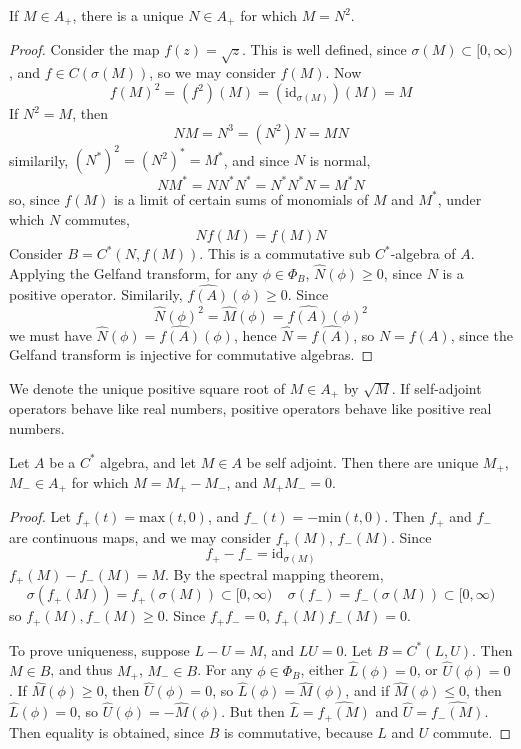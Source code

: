 \begin{prop}
    If $M \in A_+$, there is a unique $N \in A_+$ for which $M = N^2$.
\end{prop}
\begin{proof}
    Consider the map $f(z) = \sqrt{z}$. This is well defined, since $\sigma(M) \subset [0,\infty)$, and $f \in C(\sigma(M))$, so we may consider $f(M)$. Now
    \[ f(M)^2 = (f^2)(M) = (\text{id}_{\sigma(M)})(M) = M \]
    If $N^2 = M$, then
    \[ NM = N^3 = (N^2)N = MN \]
    similarily, $(N^*)^2 = (N^2)^* = M^*$, and since $N$ is normal,
    \[ NM^* = NN^*N^* = N^*N^*N = M^*N \]
    so, since $f(M)$ is a limit of certain sums of monomials of $M$ and $M^*$, under which $N$ commutes,
    \[ Nf(M) = f(M)N \]
    Consider $B = C^*(N, f(M))$. This is a commutative sub $C^*$-algebra of $A$. Applying the Gelfand transform, for any $\phi \in \Phi_B$, $\widehat{N}(\phi) \geq 0$, since $N$ is a positive operator. Similarily, $\widehat{f(A)}(\phi) \geq 0$. Since
    \[ \widehat{N}(\phi)^2 = \widehat{M}(\phi) = \widehat{f(A)}(\phi)^2 \]
    we must have $\widehat{N}(\phi) = \widehat{f(A)}(\phi)$, hence $\widehat{N} = \widehat{f(A)}$, so $N = f(A)$, since the Gelfand transform is injective for commutative algebras.
\end{proof}

We denote the unique positive square root of $M \in A_+$ by $\sqrt{M}$. If self-adjoint operators behave like real numbers, positive operators behave like positive real numbers.

\begin{prop}
    Let $A$ be a $C^*$ algebra, and let $M \in A$ be self adjoint. Then there are unique $M_+$, $M_- \in A_+$ for which $M = M_+ - M_-$, and $M_+ M_- = 0$.
\end{prop}
\begin{proof}
    Let $f_+(t) = \text{max}(t,0)$, and $f_-(t) = -\text{min}(t,0)$. Then $f_+$ and $f_-$ are continuous maps, and we may consider $f_+(M)$, $f_-(M)$. Since
    \[ f_+ - f_- = \text{id}_{\sigma(M)} \]
    $f_+(M) - f_-(M) = M$. By the spectral mapping theorem,
    \[ \sigma(f_+(M)) = f_+(\sigma(M)) \subset [0,\infty)\ \ \ \ \ \sigma(f_-) = f_-(\sigma(M)) \subset [0,\infty) \]
    so $f_+(M), f_-(M) \geq 0$. Since $f_+ f_- = 0$, $f_+(M) f_-(M) = 0$.

    To prove uniqueness, suppose $L - U = M$, and $LU = 0$. Let $B = C^*(L,U)$. Then $M \in B$, and thus $M_+$, $M_- \in B$. For any $\phi \in \Phi_B$, either $\widehat{L}(\phi) = 0$, or $\widehat{U}(\phi) = 0$. If $\widehat{M}(\phi) \geq 0$, then $\widehat{U}(\phi) = 0$, so $\widehat{L}(\phi) = \widehat{M}(\phi)$, and if $\widehat{M}(\phi) \leq 0$, then $\widehat{L}(\phi) = 0$, so $\widehat{U}(\phi) = -\widehat{M}(\phi)$. But then $\widehat{L} = \widehat{f_+(M)}$ and $\widehat{U} = \widehat{f_-(M)}$. Then equality is obtained, since $B$ is commutative, because $L$ and $U$ commute.
\end{proof}

